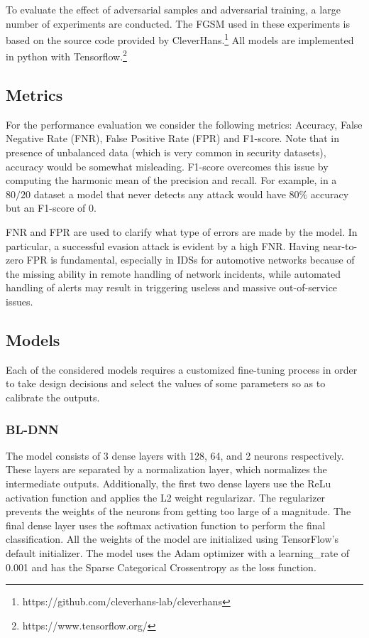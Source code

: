 \documentclass[conference]{IEEEtran}
\begin{document}
To evaluate the effect of adversarial samples and adversarial training, a large number of experiments are conducted. The FGSM used in these experiments is based on the source code provided by CleverHans.\footnote{https://github.com/cleverhans-lab/cleverhans} All models are implemented in python with Tensorflow.\footnote{https://www.tensorflow.org/}



\subsection{Metrics}


For the performance evaluation we consider the following metrics: Accuracy, False Negative Rate (FNR), False Positive Rate (FPR) and F1-score. Note that in presence of unbalanced data (which is very common in security datasets), accuracy would be somewhat misleading. F1-score overcomes this issue by computing the harmonic mean of the precision and recall. For example, in a $80/20$ dataset a model that never detects any attack would  have $80\%$ accuracy but an F1-score of $0$.

FNR and FPR are used to clarify what type of errors are made by the model. In particular, a successful evasion attack is evident by a high FNR. Having near-to-zero FPR is fundamental, especially in IDSs for automotive networks because of the missing ability in remote handling of network incidents, while automated handling of alerts may result in triggering useless and massive out-of-service issues.




\subsection{Models}
Each of the considered models requires a customized fine-tuning process in order to take design decisions and select the values of some parameters so as to calibrate the outputs. %

\subsubsection{BL-DNN}
The model consists of 3 dense layers with 128, 64, and 2 neurons respectively. These layers are separated by a normalization layer, which normalizes the intermediate outputs. Additionally, the first two dense layers use the ReLu activation function and applies the L2 weight regularizar. The regularizer prevents the weights of the neurons from getting too large of a magnitude. The final dense layer uses the softmax activation function to perform the final classification. All the weights of the model are initialized using TensorFlow's default initializer. The model uses the Adam optimizer with a learning\_rate of 0.001 and has the Sparse Categorical Crossentropy as the loss function.
\end{document}
